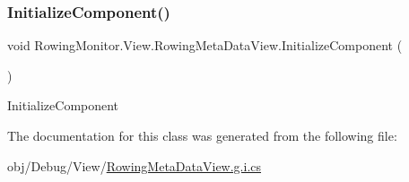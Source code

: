 \subsubsection{\texorpdfstring{Initialize\+Component()}{InitializeComponent()}}
{\footnotesize\ttfamily void Rowing\+Monitor.\+View.\+Rowing\+Meta\+Data\+View.\+Initialize\+Component (\begin{DoxyParamCaption}{ }\end{DoxyParamCaption})}



Initialize\+Component 



The documentation for this class was generated from the following file\+:\begin{DoxyCompactItemize}
\item 
obj/\+Debug/\+View/\hyperlink{_rowing_meta_data_view_8g_8i_8cs}{Rowing\+Meta\+Data\+View.\+g.\+i.\+cs}\end{DoxyCompactItemize}

